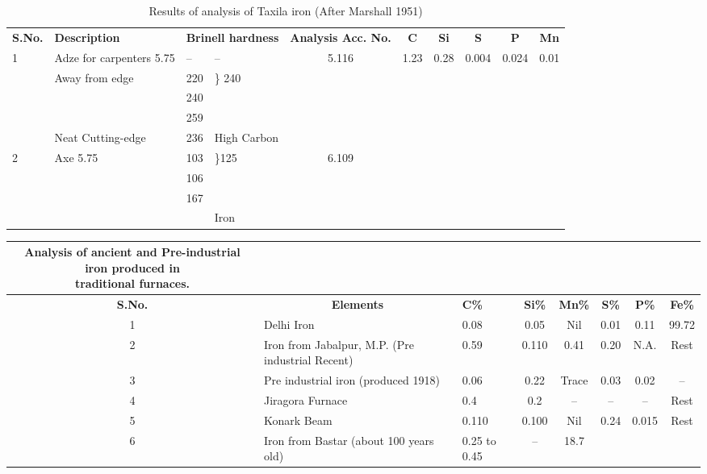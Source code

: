 {\setlength\tabcolsep{2pt}
{\fontsize{8}{10}\selectfont
\begin{longtable}{|l|p{2.5cm}|p{.5cm}|p{.5cm}|c|c|c|c|c|c|}
\captionsetup{font=small}
\caption{Results of analysis of Taxila iron (After Marshall 1951)}\label{table 8.1}\\
\hline
\textbf{S.No.} & \textbf{Description} & \multicolumn{2}{m{1.3cm}|}{\centering \textbf{Brinell  hardness}} & \multicolumn{1}{m{1.3cm}|}{\centering \textbf{Analysis Acc. No.}} & \textbf{C} & \textbf{Si} & \textbf{S} & \textbf{P} & \textbf{Mn}\\
\hline
1 & Adze for carpenters 5.75 & -- & -- & 5.116 & 1.23 & 0.28 & 0.004 & 0.024 & 0.01\\
  & Away from edge & 220  &\multirow{2}{1cm}{\} 240}&&&&&&\\
  &  & 240 &&&&&&&\\
  & & 259 &&&&&&&\\
  & Neat Cutting-edge & 236 & High Carbon &&&&&&\\
  \hline
  2 & Axe 5.75 & 103 & \multirow{3}{1cm}{\}125}& 6.109 &&&&&\\
  & & 106 &&&&&&&\\
  & & 167 &&&&&&&\\
  & & & Iron &&&&&&\\
  \hline
\end{longtable}
}}
\newpage

{\setlength\tabcolsep{2pt}
{\fontsize{8}{10}\selectfont\begin{longtable}{|c|p{3cm}|p{1cm}|c|c|c|c|c|}
\captionsetup{font=small}
\caption{Analysis of ancient and Pre-industrial iron produced in\\ traditional furnaces.}\label{table 8.2}\\
\hline
\textbf{S.No.} & \multicolumn{1}{c|}{\textbf{Elements}} & \textbf{C\%} & \textbf{Si\%} & \textbf{Mn\%} & \textbf{S\%} & \textbf{P\%} & \textbf{Fe\%} \\
\hline
1 & Delhi Iron & 0.08 & 0.05 & Nil & 0.01 & 0.11 & 99.72\\
2 & Iron from Jabalpur, M.P. (Pre industrial Recent) & 0.59 & 0.110 & 0.41 & 0.20 & N.A. & Rest\\
3 & Pre industrial iron (produced 1918) & 0.06 & 0.22 & Trace & 0.03 & 0.02 & --\\
4 & Jiragora Furnace & 0.4 & 0.2 & -- & -- & -- & Rest\\
5 & Konark Beam & 0.110 & 0.100 & Nil & 0.24 & 0.015 & Rest\\
6 & Iron from Bastar (about 100 years old) & 0.25 to 0.45 & -- & 18.7 & & & \\
\hline
\end{longtable}
}}

